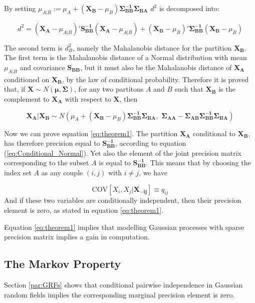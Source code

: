 \documentclass[openany]{book}
\begin{document}
By setting $ \mu_{A|B} :=  \mu_A + (\mathbf{X_B} - \mu_B) \mathbf{\Sigma_{BB}^{-1}} \mathbf{\Sigma_{BA}}$ $d^2$ is decomposed into:

$$ d^2 = 
\left( \mathbf{X_A} - \mu_{A|B} \right)' \mathbf{S_{BB}^{-1}}\left( \mathbf{X_A} - \mu_{A|B}\right) + 
\left( \mathbf{X_B} - \mu_B \right)'\mathbf{\Sigma_{BB}^{-1}}\left( \mathbf{X_B} - \mu_B\right)
$$
 
The second term is $d_B^2$, namely the Mahalanobis distance for the partition $\mathbf{X_B}$. The first term is the Mahalanobis distance of a Normal distribution with mean $\mu_{A|B}$ and covariance $\mathbf{S_{BB}}$, but it must also be the Mahalanobis distance of $\mathbf{X_A}$ conditioned on $\mathbf{X_B}$, by the law of conditional probability. 
Therefore it is proved that, if $\mathbf{X} \sim N(\mathbf{\mu}, \mathbf{\Sigma})$, for any two partitons $A$ and $B$ such that $\mathbf{X_B}$ is the complement to $\mathbf{X_A}$ with respect to $\mathbf{X}$, then 

\begin{equation}
	\mathbf{X_A} | \mathbf{X_B} \sim N \left(
	\mu_A + (\mathbf{X_B} - \mu_B) \mathbf{\Sigma_{BB}^{-1}} \mathbf{\Sigma_{BA}}, \, \,
	 \mathbf{\Sigma_{AA}} - \mathbf{\Sigma_{AB}} \mathbf{\Sigma^{-1}_{BB}} \mathbf{\Sigma_{BA}}
	 \right)
	 \label{eq:Conditional_Normal}
\end{equation}

Now we can prove equation \ref{eq:theorem1}.
The partition $\mathbf{X_A}$ conditional to $\mathbf{X_B}$, has therefore precision equal to $\mathbf{S_{BB}^{-1}}$, according to equation (\ref{eq:Conditional_Normal}). Yet also the element of the joint precision matrix corresponding to the subset $A$ is equal to $\mathbf{S_{BB}^{-1}}$.
This means that by choosing the index set $A$ as any couple $(i,j)$ with $i \neq j$, we have

\begin{equation}
	\mathrm{COV}[X_i, X_j | \mathbf{X_{-ij}}] \equiv q_{ij} 
\end{equation}
And if these two variables are conditionally independent, then their precision element is zero, as stated in equation \ref{eq:theorem1}.  

Equation \ref{eq:theorem1} implies that modelling Gaussian processes with sparse precision matrix implies a gain in computation. 
\subsection{The Markov Property}
Section \ref{par:GRFs} shows that conditional pairwise independence in Gaussian random fields implies the corresponding marginal precision element is zero. 
\end{document}
